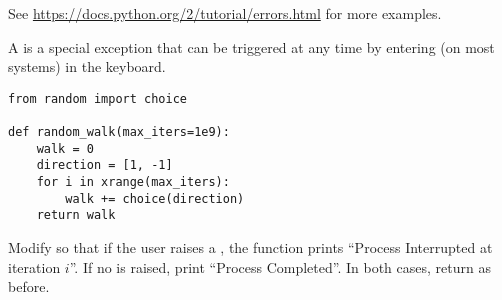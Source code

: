 \begin{comment} %
An exception that is caught by an \li{except} statement can be captured as a variable within the \li{except} block if it is declared using the keyword \li{as}.

\begin{lstlisting}
# Catch only a specific class of exceptions.
>>> try:
...     bad = 100 / 0
... except ZeroDivisionError as e:
...     print(e)
...
<<integer division or modulo by zero>>

# Here a different exception is raised than the one in the except statement.
>>> try:
...     1 + 'a' + 2 + 'b' + 3
... except ValueError as e:
...     print(e)
<<Traceback (most recent call last):
  File "<stdin>", line 2, in <module>
TypeError: unsupported operand type(s) for +: 'int' and 'str'>>

>>> try:
...     import magic
... except ImportError as e:
...     print "Sorry!", e
...
Sorry! No module named magic
\end{lstlisting}

Multiple kinds of exceptions can be caught by a single \li{except} statement using a parenthesized list of exceptions.
There can also be more than one \li{except} statements corresponding to a single \li{try} statement, each indicating which exception class(es) to catch.
An \li{else} statement can also be attached after \li{except} statements, which is only executed if the \li{try} block is executed to completion.
\end{comment}

See \url{https://docs.python.org/2/tutorial/errors.html} for more examples.

\begin{problem} %
A  is a special exception that can be triggered at any time by entering  (on most systems) in the keyboard.

\begin{lstlisting}
from random import choice

def random_walk(max_iters=1e9):
    walk = 0
    direction = [1, -1]
    for i in xrange(max_iters):
        walk += choice(direction)
    return walk
\end{lstlisting}
Modify  so that if the user raises a , the function prints ``Process Interrupted at iteration $i$''.
If no  is raised, print ``Process Completed''.
In both cases, return  as before.
\end{problem}

